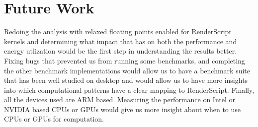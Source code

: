 \section{Future Work}
\label{sec:future}

Redoing the analysis with relaxed floating points enabled for RenderScript kernels
	and determining what impact that has on both the performance and energy utlization
	would be the first step in understanding the results better.
Fixing bugs that prevented us from running some benchmarks, and completing the
	other benchmark implementations would allow us to have a benchmark
	suite that has been well studied on desktop and would allow us to have more insights
	into which computational patterns have a clear mapping to RenderScript.
Finally, all the devices used are ARM based.
Measuring the performance on Intel or NVIDIA based CPUs or GPUs would give us
	more insight about when to use CPUs or GPUs for computation.
